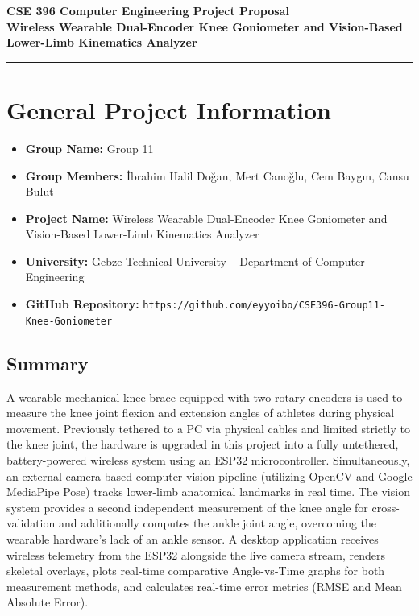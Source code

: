 \documentclass[11pt, a4paper]{article}
\begin{document}
\begin{center}
    {\LARGE \textbf{\textcolor{accentblue}{CSE 396 Computer Engineering Project Proposal}}}\\[0.4em]
    {\large \textbf{Wireless Wearable Dual-Encoder Knee Goniometer and Vision-Based Lower-Limb Kinematics Analyzer}}
\end{center}
\vspace{0.5em}
\hrule
\vspace{1em}

\section{General Project Information}

\begin{itemize}[leftmargin=1.5em, itemsep=0.25em]
    \item \textbf{Group Name:} Group 11
    \item \textbf{Group Members:} İbrahim Halil Doğan, Mert Canoğlu, Cem Baygın, Cansu Bulut
    \item \textbf{Project Name:} Wireless Wearable Dual-Encoder Knee Goniometer and Vision-Based Lower-Limb Kinematics Analyzer
    \item \textbf{University:} Gebze Technical University -- Department of Computer Engineering
    \item \textbf{GitHub Repository:} \texttt{https://github.com/eyyoibo/CSE396-Group11-Knee-Goniometer}
\end{itemize}

\subsection*{Summary}
A wearable mechanical knee brace equipped with two rotary encoders is used to measure the knee joint flexion and extension angles of athletes during physical movement. Previously tethered to a PC via physical cables and limited strictly to the knee joint, the hardware is upgraded in this project into a fully untethered, battery-powered wireless system using an ESP32 microcontroller. Simultaneously, an external camera-based computer vision pipeline (utilizing OpenCV and Google MediaPipe Pose) tracks lower-limb anatomical landmarks in real time. The vision system provides a second independent measurement of the knee angle for cross-validation and additionally computes the ankle joint angle, overcoming the wearable hardware's lack of an ankle sensor. A desktop application receives wireless telemetry from the ESP32 alongside the live camera stream, renders skeletal overlays, plots real-time comparative Angle-vs-Time graphs for both measurement methods, and calculates real-time error metrics (RMSE and Mean Absolute Error).
\end{document}
